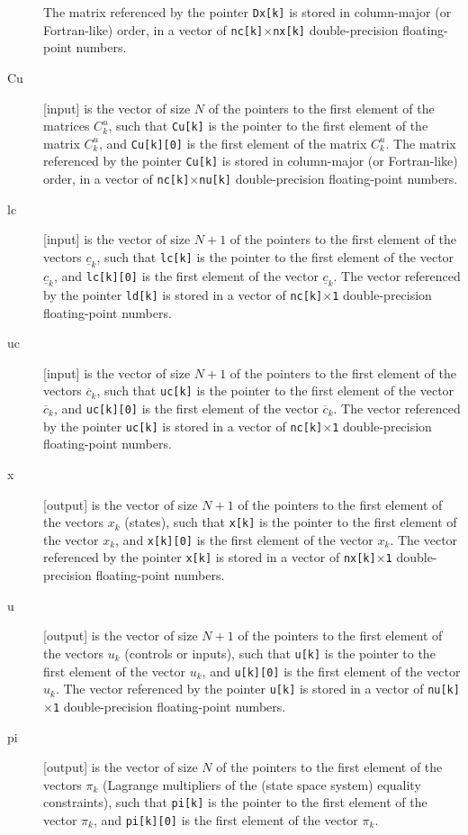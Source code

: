 \documentclass{report}
\begin{document}
\begin{description}
The matrix referenced by the pointer {\tt Dx[k]} is stored in column-major (or Fortran-like) order, in a vector of {\tt nc[k]$\times$nx[k]} double-precision floating-point numbers.
\item[Cu] [input] is the vector of size $N$ of the pointers to the first element of the matrices $C^u_k$, such that {\tt Cu[k]} is the pointer to the first element of the matrix $C^u_k$, and {\tt Cu[k][0]} is the first element of the matrix $C^u_k$.
The matrix referenced by the pointer {\tt Cu[k]} is stored in column-major (or Fortran-like) order, in a vector of {\tt nc[k]$\times$nu[k]} double-precision floating-point numbers.
\item[lc] [input] is the vector of size $N+1$ of the pointers to the first element of the vectors $\underline c_k$, such that {\tt lc[k]} is the pointer to the first element of the vector $\underline c_k$, and {\tt lc[k][0]} is the first element of the vector $\underline c_k$.
The vector referenced by the pointer {\tt ld[k]} is stored in a vector of {\tt nc[k]$\times$1} double-precision floating-point numbers.
\item[uc] [input] is the vector of size $N+1$ of the pointers to the first element of the vectors $\overline c_k$, such that {\tt uc[k]} is the pointer to the first element of the vector $\overline c_k$, and {\tt uc[k][0]} is the first element of the vector $\overline c_k$.
The vector referenced by the pointer {\tt uc[k]} is stored in a vector of {\tt nc[k]$\times$1} double-precision floating-point numbers.
\item[x] [output] is the vector of size $N+1$ of the pointers to the first element of the vectors $x_k$ (states), such that {\tt x[k]} is the pointer to the first element of the vector $x_k$, and {\tt x[k][0]} is the first element of the vector $x_k$.
The vector referenced by the pointer {\tt x[k]} is stored in a vector of {\tt nx[k]$\times$1} double-precision floating-point numbers.
\item[u] [output] is the vector of size $N+1$ of the pointers to the first element of the vectors $u_k$ (controls or inputs), such that {\tt u[k]} is the pointer to the first element of the vector $u_k$, and {\tt u[k][0]} is the first element of the vector $u_k$.
The vector referenced by the pointer {\tt u[k]} is stored in a vector of {\tt nu[k]$\times$1} double-precision floating-point numbers.
\item[pi] [output] is the vector of size $N$ of the pointers to the first element of the vectors $\pi_k$ (Lagrange multipliers of the (state space system) equality constraints), such that {\tt pi[k]} is the pointer to the first element of the vector $\pi_k$, and {\tt pi[k][0]} is the first element of the vector $\pi_k$.

\end{description}
\end{document}
